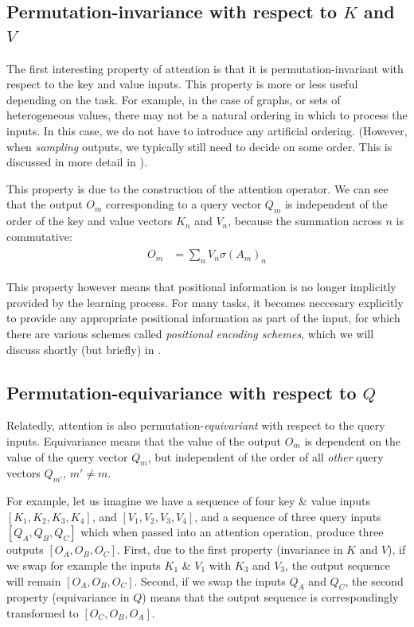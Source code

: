 \subsection{Permutation-invariance with respect to $K$ and $V$}

The first interesting property of attention is that it is permutation-invariant with respect to the key and value inputs. This property is more or less useful depending on the task. For example, in the case of graphs, or sets of heterogeneous values, there may not be a natural ordering in which to process the inputs. In this case, we do not have to introduce any artificial ordering. (However, when \textit{sampling} outputs, we typically still need to decide on some order. This is discussed in more detail in ).

This property is due to the construction of the attention operator. We can see that the output $O_m$ corresponding to a query vector $Q_m$ is independent of the order of the key and value vectors $K_n$ and $V_n$, because the summation across $n$ is commutative:
\begin{align}
\label{eqn:attn-perm-invariance}
\begin{aligned}
    O_m &= \sum_n V_n \sigma(A_{m})_n
\end{aligned}
\end{align}

This property however means that positional information is no longer implicitly provided by the learning process. For many tasks, it becomes neccesary explicitly to provide any appropriate positional information as part of the input, for which there are various schemes called \textit{positional encoding schemes}, which we will discuss shortly (but briefly) in .

\subsection{Permutation-equivariance with respect to $Q$}

Relatedly, attention is also permutation-\textit{equivariant} with respect to the query inputs. Equivariance means that the value of the output $O_m$ is dependent on the value of the query vector $Q_m$, but independent of the order of all \textit{other} query vectors $Q_{m'}$, $m' ≠ m$.

For example, let us imagine we have a sequence of four key \& value inputs $[K_1, K_2, K_3, K_4]$, and $[V_1, V_2, V_3, V_4]$, and a sequence of three query inputs $[Q_A, Q_B, Q_C]$ which when passed into an attention operation, produce three outputs $[O_A, O_B, O_C]$. First, due to the first property (invariance in $K$ and $V$), if we swap for example the inputs $K_1$ \& $V_1$ with $K_3$ and $V_3$, the output sequence will remain $[O_A, O_B, O_C]$. Second, if we swap the inputs $Q_A$ and $Q_C$, the second property (equivariance in $Q$) means that the output sequence is correspondingly transformed to $[O_C, O_B, O_A]$.

